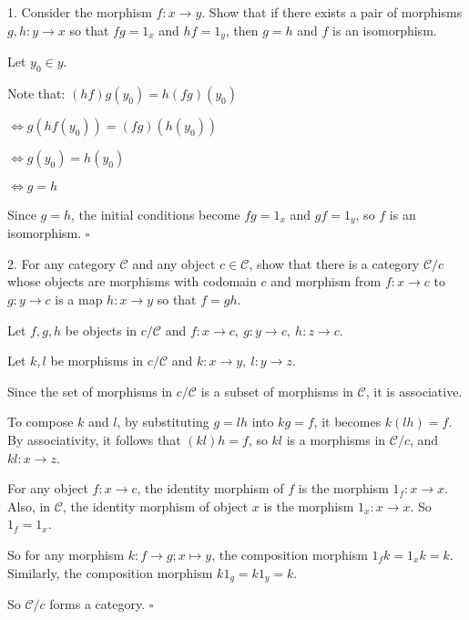 \documentclass{article}
\begin{document}
1. Consider the morphism $f: x \to y$. Show that if there exists a pair of morphisms $g, h: y \to x$ so that $fg = 1_x$ and $hf = 1_y$, then $g = h$ and $f$ is an isomorphism. 

Let $y_0 \in y$. 

Note that:
$(hf)g(y_0) = h(fg)(y_0)$

$\Leftrightarrow g(hf(y_0)) = (fg)(h(y_0))$

$\Leftrightarrow g(y_0) = h(y_0)$

$\Leftrightarrow g = h$

Since $g = h$, the initial conditions become $fg = 1_x$ and $gf = 1_y$, so $f$ is an isomorphism. $\square$

2. For any category $\mathcal{C}$ and any object $c \in \mathcal{C}$, show that there is a category $\mathcal{C}/c$ whose objects are morphisms with codomain $c$ and morphism from $f: x \to c$ to $g: y \to c$ is a map $h: x \to y$ so that $f = gh$.

Let $f, g, h$ be objects in $c / \mathcal{C}$ and $f: x \to c, ~ g: y \to c, ~ h:z \to c$. 

Let $k, l$ be morphisms in $c / \mathcal{C}$ and $k: x \to y, ~ l:y \to z$.

Since the set of morphisms in $c / \mathcal{C}$ is a subset of morphisms in $\mathcal{C}$, it is associative.

To compose $k$ and $l$, by substituting $g = lh$ into $kg = f$, it becomes $k(lh) = f$. By associativity, it follows that $(kl)h = f$, so $kl$ is a morphisms in $\mathcal{C} / c$, and $kl: x \to z$.

For any object $f: x \to c$, the identity morphism of $f$ is the morphism $1_f: x \to x$. Also, in $\mathcal{C}$, the identity morphism of object $x$ is the morphism $1_x: x \to x$. So $1_f = 1_x$. 

So for any morphism $k: f \to g; x \mapsto y$, the composition morphism $1_fk = 1_xk = k$. Similarly, the composition morphism $k1_g = k1_y = k$.

So $\mathcal{C} / c$ forms a category. $\square$
\end{document}
